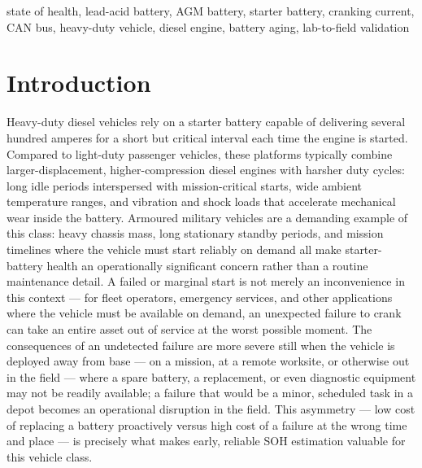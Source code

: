 \documentclass[conference]{IEEEtran}
\begin{document}
\begin{IEEEkeywords}
state of health, lead-acid battery, AGM battery, starter battery, cranking current, CAN bus, heavy-duty vehicle, diesel engine, battery aging, lab-to-field validation
\end{IEEEkeywords}

\section{Introduction}
\label{sec:intro}

Heavy-duty diesel vehicles rely on a starter battery capable of delivering several hundred amperes for a short but critical interval each time the engine is started. Compared to light-duty passenger vehicles, these platforms typically combine larger-displacement, higher-compression diesel engines with harsher duty cycles: long idle periods interspersed with mission-critical starts, wide ambient temperature ranges, and vibration and shock loads that accelerate mechanical wear inside the battery. Armoured military vehicles are a demanding example of this class: heavy chassis mass, long stationary standby periods, and mission timelines where the vehicle must start reliably on demand all make starter-battery health an operationally significant concern rather than a routine maintenance detail. A failed or marginal start is not merely an inconvenience in this context --- for fleet operators, emergency services, and other applications where the vehicle must be available on demand, an unexpected failure to crank can take an entire asset out of service at the worst possible moment. The consequences of an undetected failure are more severe still when the vehicle is deployed away from base --- on a mission, at a remote worksite, or otherwise out in the field --- where a spare battery, a replacement, or even diagnostic equipment may not be readily available; a failure that would be a minor, scheduled task in a depot becomes an operational disruption in the field. This asymmetry --- low cost of replacing a battery proactively versus high cost of a failure at the wrong time and place --- is precisely what makes early, reliable SOH estimation valuable for this vehicle class.
\end{document}
